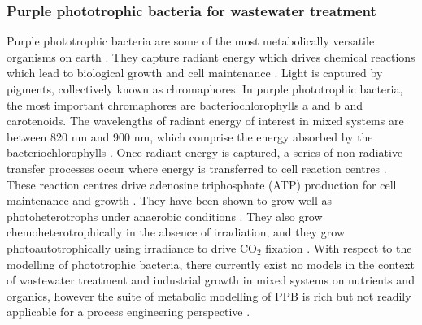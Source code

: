 \subsubsection{Purple phototrophic bacteria for wastewater treatment}
Purple phototrophic bacteria are some of the most metabolically versatile organisms on earth \cite{hunter2008}. They capture radiant energy which drives chemical reactions which lead to biological growth and cell maintenance \cite{overmann2013}. Light is captured by pigments, collectively known as chromaphores. In purple phototrophic bacteria, the most important chromaphores are bacteriochlorophylls a and b and carotenoids. The wavelengths of radiant energy of interest in mixed systems are between 820 nm and 900 nm, which comprise the energy absorbed by the bacteriochlorophylls \cite{hulsen2014}. Once radiant energy is captured, a series of non-radiative transfer processes occur where energy is transferred to cell reaction centres \cite{overmann2013}. These reaction centres drive adenosine triphosphate (ATP) production for cell maintenance and growth \cite{overmann2013}. They have been shown to grow well as photoheterotrophs under anaerobic conditions \cite{hulsen2014}. They also grow chemoheterotrophically in the absence of irradiation, and they grow photoautotrophically using irradiance to drive $\mathrm{CO_2}$ fixation \cite{gordon2014}. With respect to the modelling of phototrophic bacteria, there currently exist no models in the context of wastewater treatment and industrial growth in mixed systems on nutrients and organics, however the suite of metabolic modelling of PPB is rich but not readily applicable for a process engineering perspective \cite{klamt2002}.
\skippingparagraph
